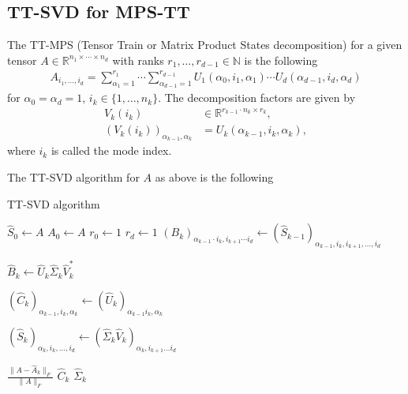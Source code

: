 \documentclass[a4paper]{article}
\begin{document}
\subsection{TT-SVD for MPS-TT}
The TT-MPS (Tensor Train or Matrix Product States decomposition) for a given
tensor $A \in \mathbb{R}^{n_1 \times \cdots \times n_d}$ with ranks $r_1,
\dots, r_{d-1} \in \mathbb{N}$ is the following
\begin{align}
    A_{i_1,\dots, i_d} =
    \sum_{\alpha_1=1}^{r_1}\cdots\sum_{\alpha_{d-1}=1}^{r_{d-1}}U_1(\alpha_0,i_1,
    \alpha_1) \cdots U_d(\alpha_{d-1}, i_d, \alpha_d)
\end{align}
for $\alpha_0 = \alpha_d = 1$, $i_k \in \{1, \dots, n_k\}$. The
decomposition factors are given by
\begin{align}
    V_k(i_k) &\in \mathbb{R}^{r_{k-1}\cdot n_k \times r_k}, \\
    (V_k(i_k))_{\alpha_{k-1}, \alpha_k} &= U_k (\alpha_{k-1}, i_k, \alpha_k),
\end{align}
where $i_k$ is called the mode index.

The TT-SVD algorithm for $A$ as above is the following
\begin{algorithm}[H]
  \caption{TT-SVD algorithm}\label{alg: ttsvd}
\begin{algorithmic}
    \State $\hat{S}_0 \gets A$
    \State $A_0 \gets A$
    \State $r_0 \gets 1$
    \State $r_d \gets 1$
        \State $(B_k)_{\alpha_{k-1}\cdot i_k, i_{k+1} \cdots i_d} \gets
                (\hat{S}_{k-1})_{\alpha_{k-1}, i_k, i_{k+1}, \dots, i_d}$

        \State $\hat{B}_k \gets \hat{U}_k \hat{\Sigma}_k \hat{V}_k^*$

        \State $(\hat{C}_k)_{\alpha_{k-1},i_k,\alpha_k} \gets
        (\hat{U}_k)_{\alpha_{k-1}i_k, \alpha_k}$ 

        \State $(\hat{S}_k)_{\alpha_k, i_k, \dots, i_d} \gets
        (\hat{\Sigma}_k\hat{V}_k)_{\alpha_k, i_{k+1} \dots i_d}$

        \State {} $\frac{\| A - \hat{A}_k\|_F}{\|A\|_F}$
        \State {} $\hat{C}_k$
        \State {} $\hat{\Sigma}_k$
    \EndFor
\end{algorithmic}
\end{algorithm}
\end{document}
